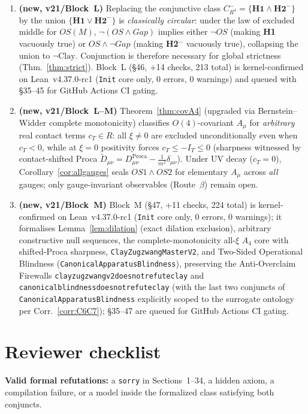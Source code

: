 \documentclass[11pt,a4paper]{article}
\def\R{R}\def\N{N}\def\Q{Q}\def\Z{Z}\def\Class{C}\def\OS{OS}\def\Gap{Gap}%
\theoremstyle{plain}
\theoremstyle{definition}
\theoremstyle{remark}
\newcommand{\R}{\mathbb{R}}\newcommand{\N}{\mathbb{N}}\newcommand{\Q}{\mathbb{Q}}
\newcommand{\Z}{\mathbb{Z}}\newcommand{\Spec}{\operatorname{Spec}}
\newcommand{\OS}{\mathrm{OS}}\newcommand{\Gap}{\mathrm{Gap}}
\newcommand{\Class}{\mathcal{C}}\newcommand{\Htot}{\mathcal{H}}
\renewcommand{\_}{\oldunderscore\allowbreak}
\newcommand{\Lean}[1]{\texttt{\small #1}}
\begin{document}
\begin{enumerate}[label=\textbf{I\arabic*.},leftmargin=30pt,itemsep=1pt]
\item \textbf{(new, v21/Block~L)} Replacing the conjunctive class $\Class^-_{\R^4}=\{\textbf{H1}\wedge\textbf{H2}^-\}$ by the union $\{\textbf{H1}\vee\textbf{H2}^-\}$ is \emph{classically circular}: under the law of excluded middle for $\OS(M)$, $\neg(\OS\wedge\Gap)$ implies either $\neg\OS$ (making \textbf{H1} vacuously true) or $\OS\wedge\neg\Gap$ (making \textbf{H2$^-$} vacuously true), collapsing the union to $\neg\mathrm{Clay}$. Conjunction is therefore necessary for global strictness (Thm.~\ref{thm:strict}). Block~L (\S46, +14 checks, 213 total) is kernel-confirmed on Lean~v4.37.0-rc1 (\texttt{Init} core only, 0 errors, 0 warnings) and queued with \S35--45 for GitHub Actions CI gating.
\item \textbf{(new, v21/Block~L--M)} Theorem~\ref{thm:covA4} (upgraded via Bernstein--Widder complete monotonicity) classifies $O(4)$-covariant $A_\mu$ for \emph{arbitrary} real contact terms $c_T\in\R$: all $\xi\neq0$ are excluded unconditionally even when $c_T<0$, while at $\xi=0$ positivity forces $c_T\le -I_T\le 0$ (sharpness witnessed by contact-shifted Proca $\widetilde{D}_{\mu\nu}=D_{\mu\nu}^{\mathrm{Proca}}-\frac{1}{m^2}\delta_{\mu\nu}$). Under UV decay ($c_T=0$), Corollary~\ref{cor:allgauges} seals $\OS1\wedge\OS2$ for elementary $A_\mu$ across \emph{all} gauges; only gauge-invariant observables (Route~$\beta$) remain open.
\item \textbf{(new, v21/Block~M)} Block~M (\S47, +11 checks, 224 total) is kernel-confirmed on Lean~v4.37.0-rc1 (\texttt{Init} core only, 0 errors, 0 warnings); it formalises Lemma~\ref{lem:dilation} (exact dilation exclusion), arbitrary constructive null sequences, the complete-monotonicity all-$\xi$ $A_4$ core with shifted-Proca sharpness, \Lean{ClayZugzwangMasterV2}, and Two-Sided Operational Blindness (\Lean{CanonicalApparatusBlindness}), preserving the Anti-Overclaim Firewalls \Lean{clay\_zugzwang\_v2\_does\_not\_refute\_clay} and \Lean{canonical\_blindness\_does\_not\_refute\_clay} (with the last two conjuncts of \Lean{CanonicalApparatusBlindness} explicitly scoped to the surrogate ontology per Corr.~\ref{corr:C6C7}); \S35--47 are queued for GitHub Actions CI gating.
\end{enumerate}
\section{Reviewer checklist}
\textbf{Valid formal refutations:} a \texttt{sorry} in Sections~1--34, a hidden axiom, a
compilation failure, or a model inside the formalized class satisfying both conjuncts.
\end{document}
